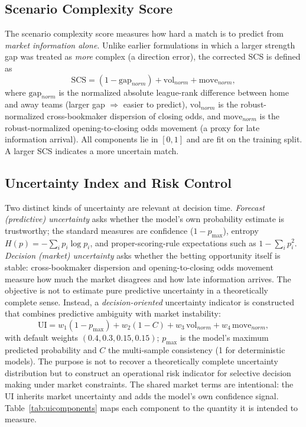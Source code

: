 \subsection{Scenario Complexity Score}
\label{sec:scs}
The scenario complexity score measures how hard a match is to
predict from \emph{market information alone}. Unlike earlier
formulations in which a larger strength gap was treated as
\emph{more} complex (a direction error), the corrected SCS is
defined as
\[
\mathrm{SCS} = (1 - \mathrm{gap}_{norm}) + \mathrm{vol}_{norm}
+ \mathrm{move}_{norm},
\]
where $\mathrm{gap}_{norm}$ is the normalized absolute league-rank
difference between home and away teams (larger gap $\Rightarrow$
easier to predict), $\mathrm{vol}_{norm}$ is the robust-normalized
cross-bookmaker dispersion of closing odds, and
$\mathrm{move}_{norm}$ is the robust-normalized opening-to-closing
odds movement (a proxy for late information arrival). All components
lie in $[0,1]$ and are fit on the training split. A larger SCS
indicates a more uncertain match.

\subsection{Uncertainty Index and Risk Control}
\label{sec:ui}
Two distinct kinds of uncertainty are relevant at decision time.
\emph{Forecast (predictive) uncertainty} asks whether the model's own
probability estimate is trustworthy; the standard measures are
confidence ($1 - p_{\max}$), entropy $H(p) = -\sum_i p_i \log p_i$,
and proper-scoring-rule expectations such as $1 - \sum_i p_i^2$.
\emph{Decision (market) uncertainty} asks whether the betting
opportunity itself is stable: cross-bookmaker dispersion and
opening-to-closing odds movement measure how much the market
disagrees and how late information arrives. The objective is not to
estimate pure predictive uncertainty in a theoretically complete
sense. Instead, a \emph{decision-oriented} uncertainty indicator is
constructed that combines predictive ambiguity with market
instability:
\[
\mathrm{UI} = w_1(1 - p_{\max}) + w_2(1 - C)
+ w_3\,\mathrm{vol}_{norm} + w_4\,\mathrm{move}_{norm},
\]
\noindent with default weights $(0.4, 0.3, 0.15, 0.15)$; $p_{\max}$ is the
model's maximum predicted probability and $C$ the multi-sample
consistency (1 for deterministic models). The purpose is not to
recover a theoretically complete uncertainty distribution but to
construct an operational risk indicator for selective decision
making under market constraints. The shared market terms are
intentional: the UI inherits market uncertainty and adds the model's
own confidence signal. Table~\ref{tab:uicomponents} maps each
component to the quantity it is intended to measure.

